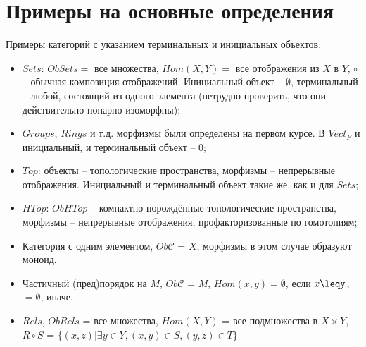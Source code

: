\documentclass[a4paper]{article}
\theoremstyle{indented}
\theoremstyle{definition}
\theoremstyle{remark}
\begin{document}
\section{Примеры на основные определения}
Примеры категорий с указанием терминальных и инициальных объектов: \begin{itemize}
\item $Sets$: $ObSets=$ все множества, $Hom(X, Y)=$ все отображения из $X$ в $Y$, $\circ$ -- обычная композиция отображений. Инициальный объект -- $\emptyset$, терминальный -- любой, состоящий из одного элемента (нетрудно проверить, что они действительно попарно изоморфны);
\item $Groups$, $Rings$ и т.д. морфизмы были определены на первом курсе. В $Vect_{F}$ и инициальный, и терминальный объект -- 0;
\item $Top$: объекты -- топологические пространства, морфизмы -- непрерывные отображения. Инициальный и терминальный объект такие же, как и для $Sets$;
\item $HTop$: $ObHTop$ -- компактно-порождённые топологические пространства, морфизмы -- непрерывные отображения, профакторизованные по гомотопиям;
\item Категория с одним элементом, $Ob\mathcal{C}$ = ${X}$, морфизмы в этом случае образуют моноид.
\item Частичный (пред)порядок на $M$, $Ob\mathcal{C}$ = $M$, $Hom(x, y) = {\emptyset}$, если $x\leqy$, $=\emptyset$, иначе.
\item $Rels$, $ObRels$ = все множества, $Hom(X, Y)$ = все подмножества в $X\times{Y}$, 
\\$R\circ S$ = $\lbrace(x, z) \vert \exists y \in Y, (x, y)\in S, (y, z)\in T\rbrace$


\end{itemize}
\end{document}
